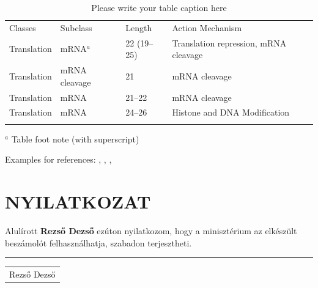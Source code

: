 \documentclass[graybox,envcountchap,sectrefs]{svmono}
\begin{document}
%
\begin{table}
	\caption{Please write your table caption here}
	\label{tab:A1}       %
	\begin{tabular}{p{2cm}p{2.4cm}p{2cm}p{4.9cm}}
		\hline\noalign{\smallskip}
		Classes & Subclass & Length & Action Mechanism  \\
		\noalign{\smallskip}\hline\noalign{\smallskip}
		Translation & mRNA$^a$  & 22 (19--25) & Translation repression, mRNA cleavage\\
		Translation & mRNA cleavage & 21 & mRNA cleavage\\
		Translation & mRNA  & 21--22 & mRNA cleavage\\
		Translation & mRNA  & 24--26 & Histone and DNA Modification\\
		\noalign{\smallskip}\hline\noalign{\smallskip}
	\end{tabular}
	$^a$ Table foot note (with superscript)
\end{table}
%

Examples for references: \cite{PlatypOUsGIT}, \cite{angeles2002fundamentals}, \cite{householder1964theory}, \cite{RozsaPalMatrix}

\newpage


	
\newpage

\chapter*{NYILATKOZAT}


Alulírott \textbf{Rezső Dezső} ezúton nyilatkozom, hogy a minisztérium az elkészült beszámolót felhasználhatja, szabadon terjesztheti.

\hspace{0.55\textwidth}
\begin{minipage}[t]{0.4\textwidth}
	\vspace*{1.5cm}  %
	\hrule
	\vspace{1mm} %
	\centering
	\begin{tabular}[t]{c}
		Rezső Dezső
	\end{tabular}
\end{minipage}
\end{document}

